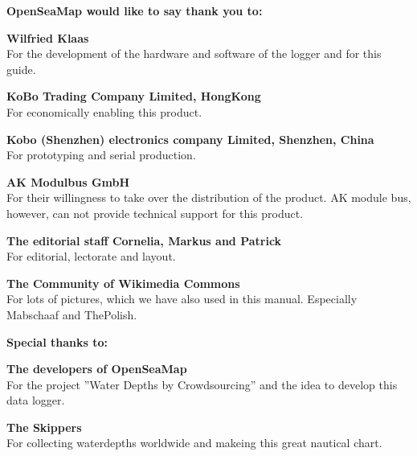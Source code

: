 \documentclass[pdftex, 8pt, paper=130mm:92mm,pagesize]{scrartcl}
\begin{document}
\textbf{OpenSeaMap would like to say thank you to:}

\textbf{Wilfried Klaas}\\
For the development of the hardware and software of the logger and for this guide.

\textbf{KoBo Trading Company Limited, HongKong}\\
For economically enabling this product.

\textbf{Kobo (Shenzhen) electronics company Limited, Shenzhen, China}\\
For prototyping and serial production.

\textbf{AK Modulbus GmbH}\\
For their willingness to take over the distribution of the product. 
AK module bus, however, can not provide technical support for this product. 

\textbf{The editorial staff Cornelia, Markus and Patrick}\\
For editorial, lectorate and layout.

\newpage
\textbf{The Community of Wikimedia Commons}\\
For lots of pictures, which we have also used in this manual. Especially Mabschaaf and ThePolish.

\vspace{2.5cm}

\textbf{Special thanks to:}

\textbf{The developers of OpenSeaMap}\\
For the project ''Water Depths by Crowdsourcing'' and the idea to develop this data logger.

\textbf{The Skippers}\\
For collecting waterdepths worldwide and makeing this great nautical chart.

\newpage
\thispagestyle{empty}
\hspace{1cm} 
\newpage
\thispagestyle{empty}
\hspace{1cm} 
\end{document}
